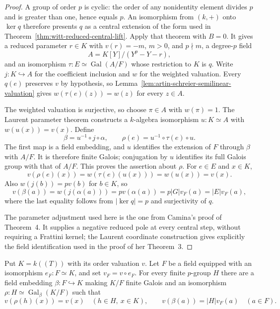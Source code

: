 \begin{proof}
A group of order $p$ is cyclic: the order of any nonidentity
element divides $p$ and is greater than one, hence equals $p$.
An isomorphism from $(k,+)$ onto $\ker q$ therefore presents
$q$ as a central extension of the form used in
Theorem~\ref{thm:witt-reduced-central-lift}.
Apply that theorem with $B=0$. It gives a reduced parameter
$r\in K$ with $v(r)=-m$, $m>0$, and $p\nmid m$, a degree-$p$
field
\[
 A=K[Y]/(Y^p-Y-r),
\]
and an isomorphism $\tau:E\simeq\operatorname{Gal}(A/F)$ whose
restriction to $K$ is $q$. Write $j:K\hookrightarrow A$ for
the coefficient inclusion and $w$ for the weighted valuation.
Every $q(e)$ preserves $v$ by hypothesis, so
Lemma~\ref{lem:artin-schreier-semilinear-valuation} gives
$w(\tau(e)(z))=w(z)$ for every $z\in A$.

The weighted valuation is surjective, so choose $\pi\in A$
with $w(\pi)=1$. The Laurent parameter theorem constructs a
$k$-algebra isomorphism $u:K\simeq A$ with
$w(u(x))=v(x)$. Define
\[
 \beta=u^{-1}\circ j\circ\alpha,
 \qquad
 \rho(e)=u^{-1}\circ\tau(e)\circ u.
\]
The first map is a field embedding, and $u$ identifies the
extension of $F$ through $\beta$ with $A/F$. It is therefore
finite Galois; conjugation by $u$ identifies its full Galois
group with that of $A/F$. This proves the assertion about
$\rho$.
For $e\in E$ and $x\in K$,
\[
 v(\rho(e)(x))=w(\tau(e)(u(x)))=w(u(x))=v(x).
\]
Also $w(j(b))=pv(b)$ for $b\in K$, so
\[
 v(\beta(a))=w(j(\alpha(a)))=p v(\alpha(a))
   =p|G|v_F(a)=|E|v_F(a),
\]
where the last equality follows from $|\ker q|=p$ and
surjectivity of $q$.

The parameter adjustment used here is the one from Camina's
proof of Theorem~4. It supplies a negative reduced pole at every
central step, without requiring a Frattini kernel; the Laurent
coordinate construction gives explicitly the field identification
used in the proof of her Theorem~3.
\end{proof}


\begin{theorem}
\label{thm:witt-finite-laurent-realization}
\leanok
Put $K=k((T))$ with its order valuation $v$.
Let $F$ be a field equipped with an isomorphism $e_F:F\simeq K$,
and set $v_F=v\circ e_F$. For every finite $p$-group $H$ there
are a field embedding $\beta:F\hookrightarrow K$ making $K/F$
finite Galois and an isomorphism
$\rho:H\simeq\operatorname{Gal}_{\beta}(K/F)$ such that
\[
 v(\rho(h)(x))=v(x)\quad(h\in H,\ x\in K),\qquad
 v(\beta(a))=|H|v_F(a)\quad(a\in F).
\]
\end{theorem}

